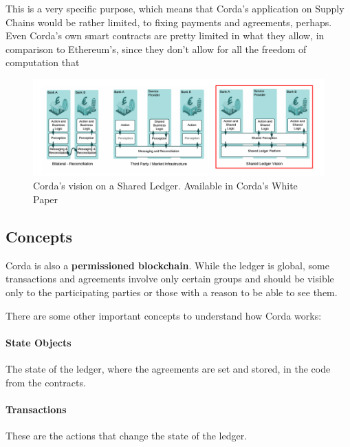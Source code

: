 This is a very specific purpose, which means that Corda's application on Supply Chains would be rather limited, to fixing payments and agreements, perhaps. Even Corda's own smart contracts are pretty limited in what they allow, in comparison to Ethereum's, since they don't allow for all the freedom of computation that


\begin{figure}[h]
\centering
\includegraphics[scale=0.16]{media/corda_shared_ledger.png}
\caption[Corda's vision on a Shared Ledger]{Corda's vision on a Shared Ledger. Available in Corda's White Paper \cite{Brown2016}}
\label{fig:shared_ledger}
\end{figure}

\subsection{Concepts}
Corda is also a \textbf{permissioned blockchain}. While the ledger is global, some transactions and agreements involve only certain groups and should be visible only to the participating parties or those with a reason to be able to see them. 

There are some other important concepts to understand how Corda works:
\paragraph{State Objects} The state of the ledger, where the agreements are set and stored, in the code from the contracts.
\paragraph{Transactions} These are the actions that change the state of the ledger.
